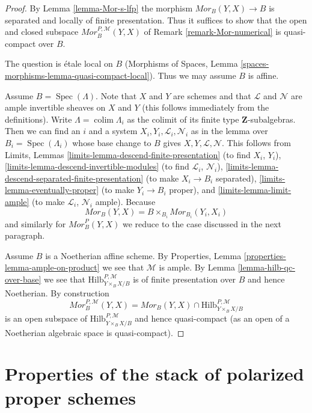 \documentclass{stacks-project}
\theoremstyle{plain}
\theoremstyle{definition}
\theoremstyle{remark}
\numberwithin{equation}{subsection}
\def\colim{\mathop{\mathrm{colim}}\nolimits}
\def\Spec{\mathop{\mathrm{Spec}}}
\def\Hilbfunctor{\mathrm{Hilb}}
\begin{document}
\begin{proof}
By Lemma \ref{lemma-Mor-s-lfp} the morphism $\mathit{Mor}_B(Y, X) \to B$
is separated and locally of finite presentation. Thus it suffices to
show that the open and closed subspace $\mathit{Mor}^{P, \mathcal{M}}_B(Y, X)$
of Remark \ref{remark-Mor-numerical} is quasi-compact over $B$.

\medskip\noindent
The question is \'etale local on $B$
(Morphisms of Spaces, Lemma \ref{spaces-morphisms-lemma-quasi-compact-local}).
Thus we may assume $B$ is affine.

\medskip\noindent
Assume $B = \Spec(\Lambda)$. Note that $X$ and
$Y$ are schemes and that $\mathcal{L}$ and $\mathcal{N}$ are ample
invertible sheaves on $X$ and $Y$ (this follows immediately from the
definitions). Write $\Lambda = \colim \Lambda_i$ as the
colimit of its finite type $\mathbf{Z}$-subalgebras. Then
we can find an $i$ and a system $X_i, Y_i, \mathcal{L}_i, \mathcal{N}_i$
as in the lemma over $B_i = \Spec(\Lambda_i)$ whose base change to
$B$ gives $X, Y, \mathcal{L}, \mathcal{N}$. This follows from
Limits, Lemmas
\ref{limits-lemma-descend-finite-presentation} (to find $X_i$, $Y_i$),
\ref{limits-lemma-descend-invertible-modules} (to find $\mathcal{L}_i$,
$\mathcal{N}_i$), \ref{limits-lemma-descend-separated-finite-presentation}
(to make $X_i \to B_i$ separated), \ref{limits-lemma-eventually-proper}
(to make $Y_i \to B_i$ proper), and \ref{limits-lemma-limit-ample}
(to make $\mathcal{L}_i$, $\mathcal{N}_i$ ample).
Because
$$
\mathit{Mor}_B(Y, X) = B \times_{B_i} \mathit{Mor}_{B_i}(Y_i, X_i)
$$
and similarly for $\mathit{Mor}^P_B(Y, X)$ we reduce
to the case discussed in the next paragraph.

\medskip\noindent
Assume $B$ is a Noetherian affine scheme. By
Properties, Lemma \ref{properties-lemma-ample-on-product}
we see that $\mathcal{M}$ is ample. By Lemma \ref{lemma-hilb-qc-over-base}
we see that $\Hilbfunctor^{P, \mathcal{M}}_{Y \times_B X/B}$ is of
finite presentation over $B$ and hence Noetherian.
By construction
$$
\mathit{Mor}^{P, \mathcal{M}}_B(Y, X) =
\mathit{Mor}_B(Y, X) \cap
\Hilbfunctor^{P, \mathcal{M}}_{Y \times_B X/B}
$$
is an open subspace of $\Hilbfunctor^{P, \mathcal{M}}_{Y \times_B X/B}$ and
hence quasi-compact (as an open of a Noetherian algebraic space
is quasi-compact).
\end{proof}






\section{Properties of the stack of polarized proper schemes}
\label{section-polarized}
\end{document}
